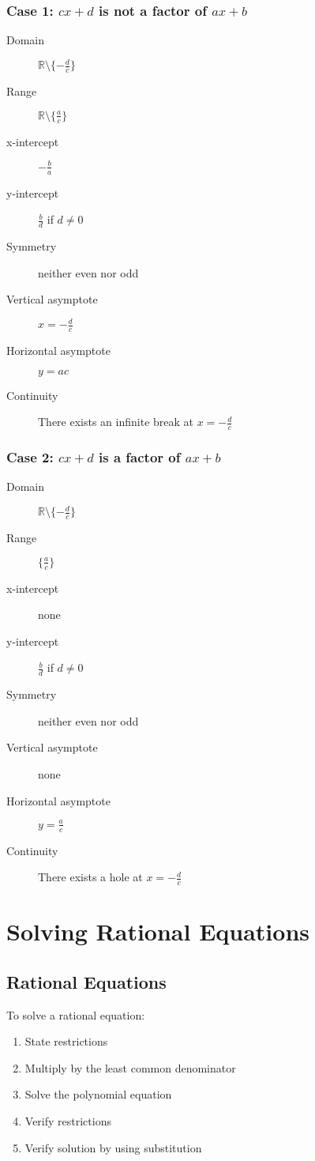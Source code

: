 			\subsubsection{Case 1: $cx+d$ is not a factor of $ax+b$}
				\begin{description}
					\item[Domain] $\mathbb{R} \setminus \{-\frac{d}{c}\}$
					\item[Range] $\mathbb{R} \setminus \{\frac{a}{c}\}$
					\item[x-intercept] $-\frac{b}{a}$
					\item[y-intercept] $\frac{b}{d}$ if $d \neq 0$
					\item[Symmetry] neither even nor odd
					\item[Vertical asymptote] $x=-\frac{d}{c}$
					\item[Horizontal asymptote] $y={a}{c}$
					\item[Continuity] There exists an infinite break at $x=-\frac{d}{c}$
				\end{description}
			\subsubsection{Case 2: $cx+d$ is a factor of $ax+b$}
				\begin{description}
					\item[Domain] $\mathbb{R} \setminus \{-\frac{d}{c}\}$
					\item[Range] $\{\frac{a}{c}\}$
					\item[x-intercept] none
					\item[y-intercept] $\frac{b}{d}$ if $d \neq 0$
					\item[Symmetry] neither even nor odd
					\item[Vertical asymptote] none
					\item[Horizontal asymptote] $y=\frac{a}{c}$
					\item[Continuity] There exists a hole at $x=-\frac{d}{c}$
				\end{description}
	\section{Solving Rational Equations}
		\subsection{Rational Equations}
			To solve a rational equation:
			\begin{enumerate}
				\item State restrictions
				\item Multiply by the least common denominator
				\item Solve the polynomial equation
				\item Verify restrictions
				\item Verify solution by using substitution
			\end{enumerate}
